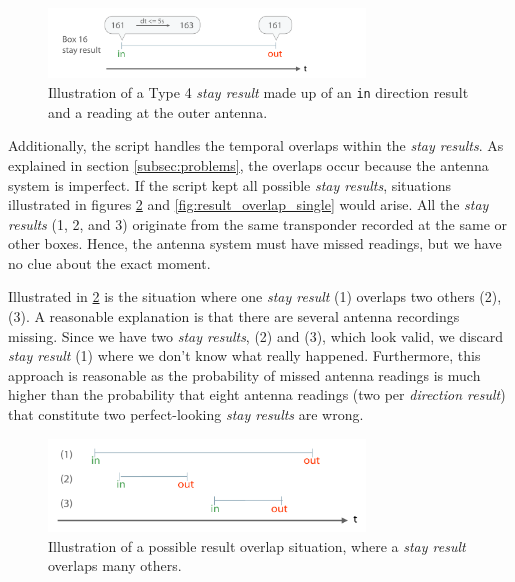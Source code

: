 \begin{figure}[htpb]
\begin{center}
  \includegraphics[width=0.75\textwidth]{assets/pdf/stay_result_type_4_schema.pdf}
  \caption[Illustration of a type 4 \textit{stay result}]{Illustration of a Type 4 \textit{stay result} made up of an \lstinline|in| direction result and a reading at the outer antenna.}
  \label{fig:type_4_stay_result}
\end{center}
\end{figure}

Additionally, the script handles the temporal overlaps within the \textit{stay results}. As explained in section \ref{subsec:problems}, the overlaps occur because the antenna system is imperfect. If the script kept all possible \textit{stay results}, situations illustrated in figures \ref{fig:result_overlap} and \ref{fig:result_overlap_single} would arise. All the \textit{stay results} (1, 2, and 3) originate from the same transponder recorded at the same or other boxes. Hence, the antenna system must have missed readings, but we have no clue about the exact moment.  

Illustrated in \ref{fig:result_overlap} is the situation where one \textit{stay result} (1) overlaps two others (2),(3). A reasonable explanation is that there are several antenna recordings missing. Since we have two \textit{stay results}, (2) and (3), which look valid, we discard \textit{stay result} (1) where we don't know what really happened. Furthermore, this approach is reasonable as the probability of missed antenna readings is much higher than the probability that eight antenna readings (two per \textit{direction result}) that constitute two perfect-looking \textit{stay results} are wrong.

\begin{figure}[htpb]
\begin{center}
  \includegraphics[width=0.75\textwidth]{assets/pdf/result_overlaps_schema.pdf}
  \caption[Illustration of a possible result overlap situation]{Illustration of a possible result overlap situation, where a \textit{stay result} overlaps many others.}
  \label{fig:result_overlap}
\end{center}
\end{figure}

